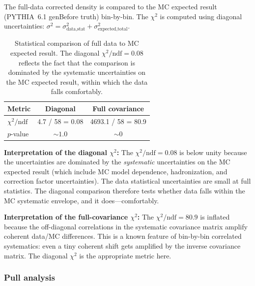 \documentclass[11pt,a4paper]{article}
\begin{document}
The full-data corrected density is compared to the MC expected result
(PYTHIA~6.1 genBefore truth) bin-by-bin.  The $\chi^2$ is computed using
diagonal uncertainties:
$\sigma^2 = \sigma_\text{data,stat}^2 + \sigma_\text{expected,total}^2$.

\begin{table}[htbp]
\centering
\caption{Statistical comparison of full data to MC expected result.
  The diagonal $\chi^2/\text{ndf} = 0.08$ reflects the fact that the
  comparison is dominated by the systematic uncertainties on the MC
  expected result, within which the data falls comfortably.}
\label{tbl:full-chi2}
\begin{tabular}{lcc}
\toprule
Metric & Diagonal & Full covariance \\
\midrule
$\chi^2/\text{ndf}$ & 4.7 / 58 = 0.08 & 4693.1 / 58 = 80.9 \\
$p$-value & $\sim 1.0$ & $\sim 0$ \\
\bottomrule
\end{tabular}
\end{table}

\textbf{Interpretation of the diagonal $\chi^2$:}  The
$\chi^2/\text{ndf} = 0.08$ is below unity because the uncertainties are
dominated by the \emph{systematic} uncertainties on the MC expected
result (which include MC model dependence, hadronization, and correction
factor uncertainties).  The data statistical uncertainties are small at
full statistics.  The diagonal comparison therefore tests whether data
falls within the MC systematic envelope, and it does---comfortably.

\textbf{Interpretation of the full-covariance $\chi^2$:}  The
$\chi^2/\text{ndf} = 80.9$ is inflated because the off-diagonal
correlations in the systematic covariance matrix amplify coherent
data/MC differences.  This is a known feature of bin-by-bin correlated
systematics: even a tiny coherent shift gets amplified by the inverse
covariance matrix.  The diagonal $\chi^2$ is the appropriate metric here.

\subsubsection{Pull analysis}
\end{document}
